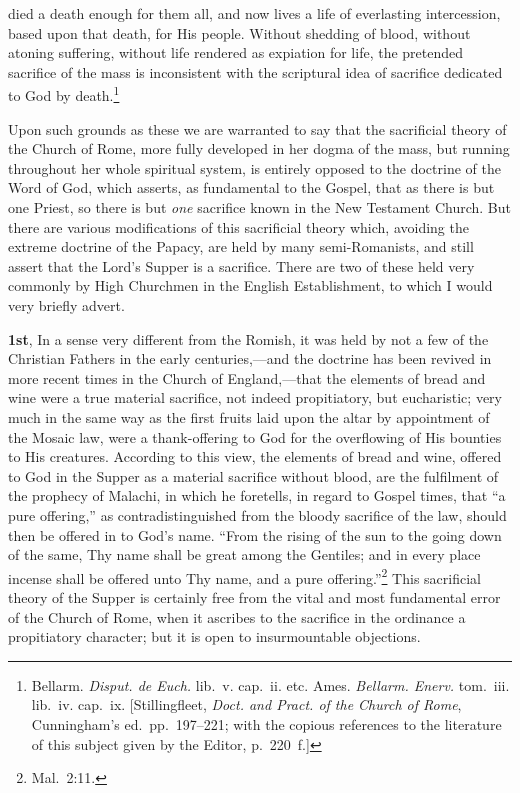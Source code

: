 \documentclass[
  english,
]{book}
\begin{document}
died a death enough for them all, and now lives a life of everlasting intercession, based upon that death, for His people. Without shedding of blood, without atoning suffering, without life rendered as expiation for life, the pretended sacrifice of the mass is inconsistent with the scriptural idea of sacrifice dedicated to God by death.\footnote{Bellarm. \emph{Disput. de Euch.} lib.~v. cap.~ii. etc. Ames. \emph{Bellarm. Enerv.} tom.~iii. lib.~iv. cap.~ix. {[}Stillingfleet, \emph{Doct. and Pract. of the Church of Rome}, Cunningham's ed.~pp.~197--221; with the copious references to the literature of this subject given by the Editor, p.~220~f.{]}}

Upon such grounds as these we are warranted to say that the sacrificial theory of the Church of Rome, more fully developed in her dogma of the mass, but running throughout her whole spiritual system, is entirely opposed to the doctrine of the Word of God, which asserts, as fundamental to the Gospel, that as there is but one Priest, so there is but \emph{one} sacrifice known in the New Testament Church. But there are various modifications of this sacrificial theory which, avoiding the extreme doctrine of the Papacy, are held by many semi-Romanists, and still assert that the Lord's Supper is a sacrifice. There are two of these held very commonly by High Churchmen in the English Establishment, to which I would very briefly advert.

\textbf{1st}, In a sense very different from the Romish, it was held by not a few of the Christian Fathers in the early centuries,---and the doctrine has been revived in more recent times in the Church of England,---that the elements of bread and wine were a true material sacrifice, not indeed propitiatory, but eucharistic; very much in the same way as the first fruits laid upon the altar by appointment of the Mosaic law, were a thank-offering to God for the overflowing of His bounties to His creatures. According to this view, the elements of bread and wine, offered to God in the Supper as a material sacrifice without blood, are the fulfilment of the prophecy of Malachi, in which he foretells, in regard to Gospel times, that ``a pure offering,'' as contradistinguished from the bloody sacrifice of the law, should then be offered in to God's name. ``From the rising of the sun to the going down of the same, Thy name shall be great among the Gentiles; and in every place incense shall be offered unto Thy name, and a pure offering.''\footnote{Mal.~2:11.} This sacrificial theory of the Supper is certainly free from the vital and most fundamental error of the Church of Rome, when it ascribes to the sacrifice in the ordinance a propitiatory character; but it is open to insurmountable objections.
\end{document}
